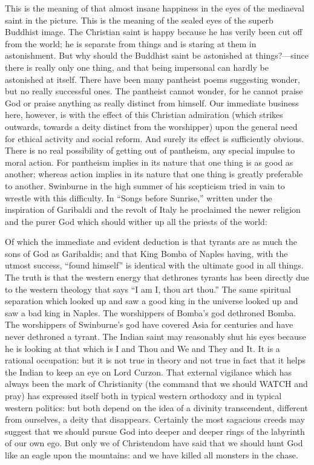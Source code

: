 This is the meaning of that almost insane happiness in the eyes of the mediaeval saint in the picture. This is the meaning of the sealed eyes of the superb Buddhist image. The Christian saint is happy because he has verily been cut off from the world; he is separate from things and is staring at them in astonishment. But why should the Buddhist saint be astonished at things?—since there is really only one thing, and that being impersonal can hardly be astonished at itself. There have been many pantheist poems suggesting wonder, but no really successful ones. The pantheist cannot wonder, for he cannot praise God or praise anything as really distinct from himself. Our immediate business here, however, is with the effect of this Christian admiration (which strikes outwards, towards a deity distinct from the worshipper) upon the general need for ethical activity and social reform. And surely its effect is sufficiently obvious. There is no real possibility of getting out of pantheism, any special impulse to moral action. For pantheism implies in its nature that one thing is as good as another; whereas action implies in its nature that one thing is greatly preferable to another. Swinburne in the high summer of his scepticism tried in vain to wrestle with this difficulty. In “Songs before Sunrise,” written under the inspiration of Garibaldi and the revolt of Italy he proclaimed the newer religion and the purer God which should wither up all the priests of the world:

Of which the immediate and evident deduction is that tyrants are as much the sons of God as Garibaldis; and that King Bomba of Naples having, with the utmost success, “found himself” is identical with the ultimate good in all things. The truth is that the western energy that dethrones tyrants has been directly due to the western theology that says “I am I, thou art thou.” The same spiritual separation which looked up and saw a good king in the universe looked up and saw a bad king in Naples. The worshippers of Bomba’s god dethroned Bomba. The worshippers of Swinburne’s god have covered Asia for centuries and have never dethroned a tyrant. The Indian saint may reasonably shut his eyes because he is looking at that which is I and Thou and We and They and It. It is a rational occupation: but it is not true in theory and not true in fact that it helps the Indian to keep an eye on Lord Curzon. That external vigilance which has always been the mark of Christianity (the command that we should WATCH and pray) has expressed itself both in typical western orthodoxy and in typical western politics: but both depend on the idea of a divinity transcendent, different from ourselves, a deity that disappears. Certainly the most sagacious creeds may suggest that we should pursue God into deeper and deeper rings of the labyrinth of our own ego. But only we of Christendom have said that we should hunt God like an eagle upon the mountains: and we have killed all monsters in the chase.

